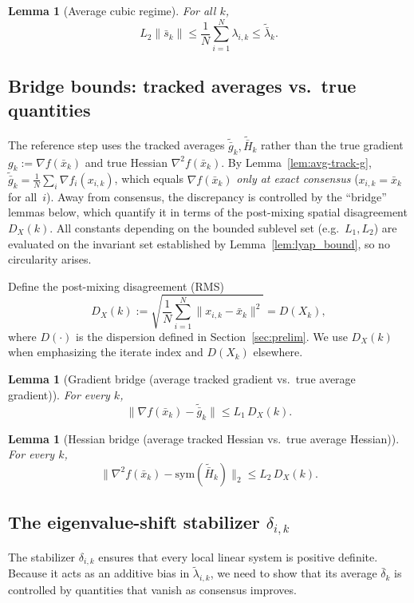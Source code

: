 \documentclass[11pt,a4paper]{article}
\newtheorem{lemma}[theorem]{Lemma}
\begin{document}
\begin{lemma}[Average cubic regime]\label{lem:avg-regime}
For all $k$,
\[
L_2\|\bar s_k\|\le \frac1N\sum_{i=1}^N \lambda_{i,k}\le \tilde{\bar\lambda}_k.
\]
\end{lemma}

\subsection{Bridge bounds: tracked averages vs.\ true quantities}\label{ssec:bridge}
The reference step uses the tracked averages
$\tilde{\bar g}_k,\tilde{\bar H}_k$ rather than the true gradient
$g_k:=\nabla f(\bar x_k)$ and true Hessian
$\nabla^2 f(\bar x_k)$.
By Lemma~\ref{lem:avg-track-g},
$\tilde{\bar g}_k = \frac{1}{N}\sum_{i}\nabla f_i(x_{i,k})$,
which equals $\nabla f(\bar x_k)$ \emph{only at exact consensus}
($x_{i,k}=\bar x_k$ for all~$i$).
Away from consensus, the discrepancy is controlled by the
``bridge'' lemmas below, which quantify it in terms of the
post-mixing spatial disagreement $D_X(k)$.
All constants depending on the bounded sublevel set
(e.g.\ $L_1,L_2$) are evaluated on the invariant set
established by Lemma~\ref{lem:lyap_bound}, so no circularity arises.

Define the post-mixing disagreement (RMS)
\[
D_X(k):=\sqrt{\frac1N\sum_{i=1}^N \|x_{i,k}-\bar x_k\|^2}
= D(X_k),
\]
where $D(\cdot)$ is the dispersion defined in Section~\ref{sec:prelim}.
We use $D_X(k)$ when emphasizing the iterate index and $D(X_k)$ elsewhere.

\begin{lemma}[Gradient bridge (average tracked gradient vs.\ true average gradient)]\label{lem:bridge-grad}
For every $k$,
\[
\|\nabla f(\bar x_k)-\tilde{\bar g}_k\|\le L_1\,D_X(k).
\]
\end{lemma}

\begin{lemma}[Hessian bridge (average tracked Hessian vs.\ true average Hessian)]\label{lem:bridge-hess}
For every $k$,
\[
\|\nabla^2 f(\bar x_k)-\mathrm{sym}(\tilde{\bar H}_k)\|_2\le L_2\,D_X(k).
\]
\end{lemma}

\subsection{The eigenvalue-shift stabilizer \texorpdfstring{$\delta_{i,k}$}{delta\_ik}}\label{ssec:stab}
The stabilizer $\delta_{i,k}$ ensures that every local linear system
is positive definite.
Because it acts as an additive bias in $\tilde\lambda_{i,k}$, we need
to show that its average $\bar\delta_k$ is controlled by quantities
that vanish as consensus improves.
\end{document}

